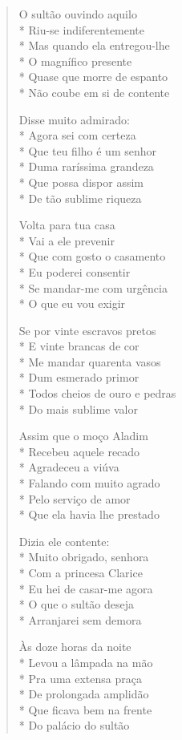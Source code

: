 \begin{verse}
O sultão ouvindo aquilo\\*
Riu-se indiferentemente\\*
Mas quando ela entregou-lhe\\*
O magnífico presente\\*
Quase que morre de espanto\\*
Não coube em si de contente

Disse muito admirado:\\*
Agora sei com certeza\\*
Que teu filho é um senhor\\*
Duma raríssima grandeza\\*
Que possa dispor assim\\*
De tão sublime riqueza

Volta para tua casa\\*
Vai a ele prevenir\\*
Que com gosto o casamento\\*
Eu poderei consentir\\*
Se mandar-me com urgência\\*
O que eu vou exigir

Se por vinte escravos pretos\\*
E vinte brancas de cor\\*
Me mandar quarenta vasos\\*
Dum esmerado primor\\*
Todos cheios de ouro e pedras\\*
Do mais sublime valor

Assim que o moço Aladim\\*
Recebeu aquele recado\\*
Agradeceu a viúva\\*
Falando com muito agrado\\*
Pelo serviço de amor\\*
Que ela havia lhe prestado

Dizia ele contente:\\*
Muito obrigado, senhora\\*
Com a princesa Clarice\\*
Eu hei de casar-me agora\\*
O que o sultão deseja\\*
Arranjarei sem demora

Às doze horas da noite\\*
Levou a lâmpada na mão\\*
Pra uma extensa praça\\*
De prolongada amplidão\\*
Que ficava bem na frente \\*
Do palácio do sultão


\end{verse}
